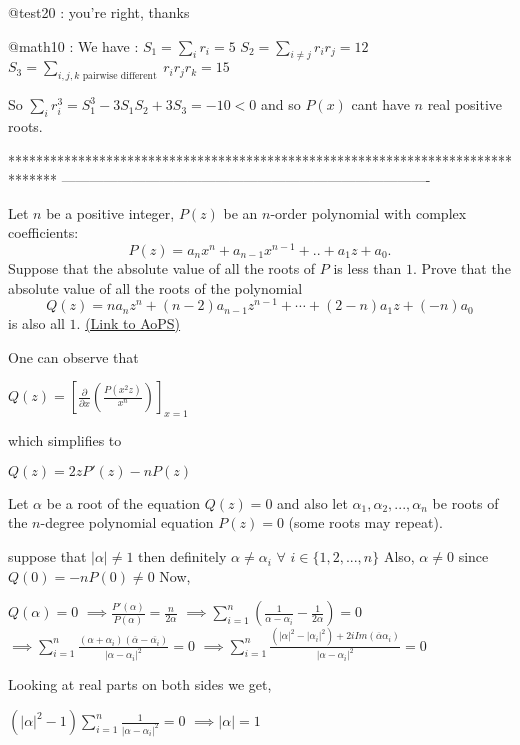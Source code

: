 \begin{solution}
	@test20 : you're right, thanks

@math10 :
We have :
$ S_1 = \sum_ir_i = 5$
$ S_2 = \sum_{i\neq j}r_ir_j = 12$
$ S_3 = \sum_{i,j,k\text{ pairwise different }}r_ir_jr_k = 15$

So $ \sum_ir_i^3 = S_1^3 - 3S_1S_2 + 3S_3 = - 10 < 0$ and so $ P(x)$ cant have $ n$ real positive roots.
\end{solution}
*******************************************************************************
-------------------------------------------------------------------------------

\begin{problem}
	Let $ n$ be a positive integer, $ P(z)$ be an $ n$-order polynomial with complex coefficients:
 \[ P(z)= a_nx^n + a_{n - 1}x^{n - 1} + .. + a_1z + a_0.\]
Suppose that the absolute value of all the roots of $P$ is less than $1$. Prove that the absolute value of all the roots of the polynomial
 \[Q(z) = na_nz^n + (n - 2)a_{n - 1}z^{n - 1} + \cdots + (2 - n)a_1z + ( - n)a_0\] 	
is also all $1$.
	\flushright \href{https://artofproblemsolving.com/community/c6h286665}{(Link to AoPS)}
\end{problem}



\begin{solution}
	One can observe that

$ Q(z) = \left[ \frac{\partial}{\partial x}\left( \frac{P(x^2z)}{x^n}\right) \right]_{x=1}$

which simplifies to 

$ Q(z) = 2zP'(z) -nP(z)$

Let $ \alpha$ be a root of the equation $ Q(z)=0$ and also let $ \alpha_1,\alpha_2,...,\alpha_n$ be roots of the $ n$-degree polynomial equation $ P(z)=0$ (some roots may repeat).

suppose that $ |\alpha| \neq 1$ then definitely $ \alpha \neq \alpha_i$ $ \forall$ $ i \in \{1,2,...,n\}$
Also, $ \alpha \neq 0$ since $ Q(0) = -nP(0) \neq 0$
Now,

$ Q(\alpha) = 0$
$ \implies \frac{P'(\alpha)}{P(\alpha)} = \frac{n}{2\alpha}$
$ \implies \sum_{i=1}^n \left( \frac{1}{\alpha -\alpha_i} - \frac{1}{2\alpha}\right) = 0$
$ \implies \sum_{i=1}^n  \frac{(\alpha + \alpha_i)(\overline{\alpha} -\overline{\alpha_i})}{|\alpha -\alpha_i|^2}  = 0$
$ \implies \sum_{i=1}^n  \frac{(|\alpha|^2 - |\alpha_i|^2) + 2i Im(\overline{\alpha}\alpha_i)}{|\alpha -\alpha_i|^2}  = 0$

Looking at real parts on both sides we get,

$ (|\alpha|^2 - 1)\sum_{i=1}^n  \frac{1}{|\alpha -\alpha_i|^2}  = 0$
$ \implies |\alpha| = 1$
\end{solution}



